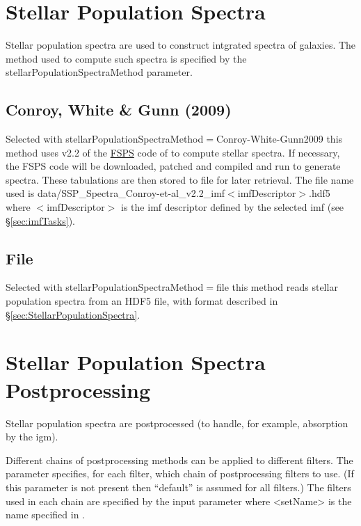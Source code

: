 \section{Stellar Population Spectra}

Stellar population spectra are used to construct intgrated spectra of galaxies. The method used to compute such spectra is specified by the {\normalfont \ttfamily stellarPopulationSpectraMethod} parameter.

\subsection{Conroy, White \& Gunn (2009)}

Selected with {\normalfont \ttfamily stellarPopulationSpectraMethod}$=${\normalfont \ttfamily Conroy-White-Gunn2009} this method uses v2.2 of the \href{http://www.cfa.harvard.edu/~cconroy/FSPS.html}{{\normalfont \ttfamily FSPS}} code of \cite{conroy_propagation_2009} to compute stellar spectra. If necessary, the {\normalfont \ttfamily FSPS} code will be downloaded, patched and compiled and run to generate spectra. These tabulations are then stored to file for later retrieval. The file name used is {\normalfont \ttfamily data/SSP\_Spectra\_Conroy-et-al\_v2.2\_imf$<$imfDescriptor$>$.hdf5} where $<${\normalfont \ttfamily imfDescriptor}$>$ is the \gls{imf} descriptor defined by the selected \gls{imf} (see \S\ref{sec:imfTasks}).

\subsection{File}

Selected with {\normalfont \ttfamily stellarPopulationSpectraMethod}$=${\normalfont \ttfamily file} this method reads stellar population spectra from an HDF5 file, with format described in \S\ref{sec:StellarPopulationSpectra}.

\section{Stellar Population Spectra Postprocessing}\label{sec:StellarSpectraPostprocessing}

Stellar population spectra are postprocessed (to handle, for example, absorption by the \gls{igm}).

Different chains of postprocessing methods can be applied to different filters. The {\normalfont \ttfamily [luminosityPostprocessSet]} parameter specifies, for each filter, which chain of postprocessing filters to use. (If this parameter is not present then ``{\normalfont \ttfamily default}'' is assumed for all filters.) The filters used in each chain are specified by the input parameter {\normalfont {}} where {\normalfont \ttfamily \textless setName\textgreater} is the name specified in {\normalfont \ttfamily [luminosityPostprocessSet]}.

